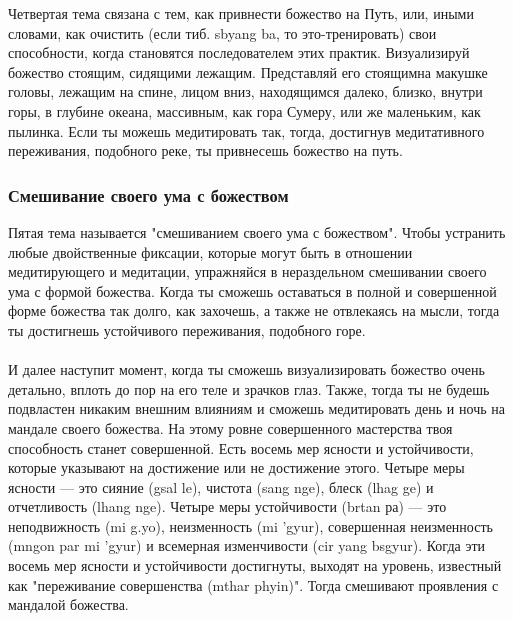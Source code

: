 Четвертая тема связана с тем, как привнести божество на Путь, или, иными словами,
как очистить (если тиб. sbyang ba, то это-тренировать) свои способности, когда
становятся последователем этих практик. Визуализируй божество стоящим, сидящими
лежащим. Представляй его стоящимна макушке головы, лежащим на спине, лицом вниз,
находящимся далеко, близко, внутри горы, в глубине океана, массивным, как гора Сумеру,
или же маленьким, как пылинка. Если ты можешь медитировать так, тогда, достигнув
медитативного переживания, подобного реке, ты привнесешь божество на путь.\\

\subsubsection{Смешивание своего ума с божеством}

Пятая тема называется "смешиванием своего ума с божеством". Чтобы устранить
любые двойственные фиксации, которые могут быть в отношении медитирующего и
медитации, упражняйся в нераздельном смешивании своего ума с формой божества. Когда
ты сможешь оставаться в полной и совершенной форме божества так долго, как захочешь, а
также не отвлекаясь на мысли, тогда ты достигнешь устойчивого переживания, подобного
горе.\\
\\
И далее наступит момент, когда ты сможешь визуализировать божество очень
детально, вплоть до пор на его теле и зрачков глаз. Также, тогда ты не будешь подвластен
никаким внешним влияниям и сможешь медитировать день и ночь на мандале своего
божества. На этому ровне совершенного мастерства твоя способность станет совершенной.
Есть восемь мер ясности и устойчивости, которые указывают на достижение или не
достижение этого. Четыре меры ясности — это сияние (gsal le), чистота (sang nge), блеск (lhag
ge) и отчетливость (lhang nge). Четыре меры устойчивости (brtan ра) — это неподвижность (mi
g.yo), неизменность (mi 'gyur), совершенная неизменность (mngon par mi 'gyur) и всемерная
изменчивости (cir yang bsgyur). Когда эти восемь мер ясности и устойчивости достигнуты,
выходят на уровень, известный как "переживание совершенства (mthar phyin)". Тогда
смешивают проявления с мандалой божества.\\

